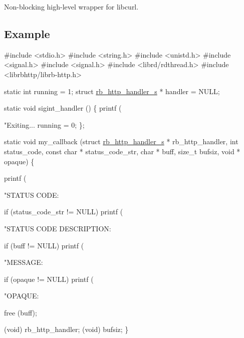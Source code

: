 Non-\/blocking high-\/level wrapper for libcurl.

\subsection*{Example}


\begin{DoxyCode}
\textcolor{preprocessor}{#include <stdio.h>}
\textcolor{preprocessor}{#include <string.h>}
\textcolor{preprocessor}{#include <unistd.h>}
\textcolor{preprocessor}{#include <signal.h>}
\textcolor{preprocessor}{#include <signal.h>}
\textcolor{preprocessor}{#include <librd/rdthread.h>}
\textcolor{preprocessor}{#include <librbhttp/librb-http.h>}

\textcolor{keyword}{static} \textcolor{keywordtype}{int} running = 1;
\textcolor{keyword}{struct }\hyperlink{structrb__http__handler__s}{rb\_http\_handler\_s} * handler = NULL;

\textcolor{keyword}{static} \textcolor{keywordtype}{void} sigint\_handler () \{
    printf (\textcolor{stringliteral}{"Exiting... %
    running = 0;
\};

\textcolor{keyword}{static} \textcolor{keywordtype}{void} my\_callback (\textcolor{keyword}{struct} \hyperlink{structrb__http__handler__s}{rb\_http\_handler\_s} * rb\_http\_handler,
                         \textcolor{keywordtype}{int} status\_code,
                         \textcolor{keyword}{const} \textcolor{keywordtype}{char} * status\_code\_str,
                         \textcolor{keywordtype}{char} * buff,
                         \textcolor{keywordtype}{size\_t} bufsiz,
                         \textcolor{keywordtype}{void} * opaque) \{

    printf (\textcolor{stringliteral}{"STATUS CODE: %

    \textcolor{keywordflow}{if} (status\_code\_str != NULL)
        printf (\textcolor{stringliteral}{"STATUS CODE DESCRIPTION: %

    \textcolor{keywordflow}{if} (buff != NULL)
        printf (\textcolor{stringliteral}{"MESSAGE: %

    \textcolor{keywordflow}{if} (opaque != NULL)
        printf (\textcolor{stringliteral}{"OPAQUE: %

    free (buff);

    (void) rb\_http\_handler;
    (void) bufsiz;
\}

}}}}}
\end{DoxyCode}
